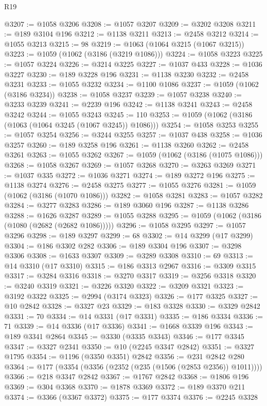 \begin{lexlean}{R19}
\begin{coremodule}
@3207 := @1058 @3206
@3208 := @1057 @3207
@3209 := @3202 @3208
@3211 := @189 @3104 @196
@3212 := @1138 @3211
@3213 := @2458 @3212
@3214 := @1055 @3213
@3215 := 98
@3219 := @1063 (@1064 @3215 (@1067 @3215))
@3223 := @1059 (@1062 (@3186 (@3219 @1086)))
@3224 := @1058 @3223
@3225 := @1057 @3224
@3226 := @3214 @3225
@3227 := @1037 @433
@3228 := @1036 @3227
@3230 := @189 @3228 @196
@3231 := @1138 @3230
@3232 := @2458 @3231
@3233 := @1055 @3232
@3234 := @1100 @1086
@3237 := @1059 (@1062 (@3186 @3234))
@3238 := @1058 @3237
@3239 := @1057 @3238
@3240 := @3233 @3239
@3241 := @2239 @196
@3242 := @1138 @3241
@3243 := @2458 @3242
@3244 := @1055 @3243
@3245 := 110
@3253 := @1059 (@1062 (@3186 (@1063 (@1064 @3245 (@1067 @3245)) @1086)))
@3254 := @1058 @3253
@3255 := @1057 @3254
@3256 := @3244 @3255
@3257 := @1037 @438
@3258 := @1036 @3257
@3260 := @189 @3258 @196
@3261 := @1138 @3260
@3262 := @2458 @3261
@3263 := @1055 @3262
@3267 := @1059 (@1062 (@3186 (@1075 @1086)))
@3268 := @1058 @3267
@3269 := @1057 @3268
@3270 := @3263 @3269
@3271 := @1037 @335
@3272 := @1036 @3271
@3274 := @189 @3272 @196
@3275 := @1138 @3274
@3276 := @2458 @3275
@3277 := @1055 @3276
@3281 := @1059 (@1062 (@3186 (@1070 @1086)))
@3282 := @1058 @3281
@3283 := @1057 @3282
@3284 := @3277 @3283
@3286 := @189 @3060 @196
@3287 := @1138 @3286
@3288 := @1626 @3287
@3289 := @1055 @3288
@3295 := @1059 (@1062 (@3186 (@1080 (@2682 (@2682 @1086)))))
@3296 := @1058 @3295
@3297 := @1057 @3296
@3298 := @189 @3297
@3299 := 68
@3302 := @14 @3299 (@17 @3299)
@3304 := @186 @3302 @282
@3306 := @189 @3304 @196
@3307 := @3298 @3306
@3308 := @1633 @3307
@3309 := @3289 @3308
@3310 := 69
@3313 := @14 @3310 (@17 @3310)
@3315 := @186 @3313 @2967
@3316 := @3309 @3315
@3317 := @3284 @3316
@3318 := @3270 @3317
@3319 := @3256 @3318
@3320 := @3240 @3319
@3321 := @3226 @3320
@3322 := @3209 @3321
@3323 := @3192 @3322
@3325 := @2994 (@3174 @3323)
@3326 := @177 @3325
@3327 := @10 @2842
@3328 := @3327 @23
@3329 := @183 @3328
@3330 := @3329 @2842
@3331 := 70
@3334 := @14 @3331 (@17 @3331)
@3335 := @186 @3334
@3336 := 71
@3339 := @14 @3336 (@17 @3336)
@3341 := @1668 @3339 @196
@3343 := @189 @3341 @2864
@3345 := @3330 (@3335 @3343)
@3346 := @177 @3345
@3347 := @3327 @2341
@3350 := @10 (@2245 @3347 @2842)
@3351 := @3327 @1795
@3354 := @1196 (@3350 @3351) @2842
@3356 := @231 @2842 @280
@3364 := @177 (@3354 (@3356 (@2352 (@235 (@1506 (@2853 @2356)) @1011))))
@3366 := @218 @3347 @2842
@3367 := @1767 @2842
@3368 := @1806 @196
@3369 := @304 @3368
@3370 := @1878 @3369
@3372 := @189 @3370 @211
@3374 := @3366 (@3367 @3372)
@3375 := @177 @3374
@3376 := @2245 @3328

\end{coremodule}
\end{lexlean}
